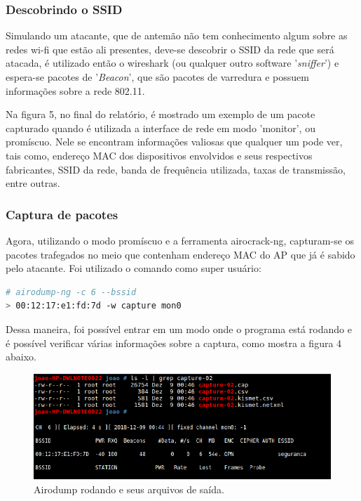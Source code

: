 \documentclass[journal]{IEEEtran}
\begin{document}
\subsubsection{Descobrindo o SSID}
Simulando um atacante, que de antemão não tem conhecimento algum sobre as redes wi-fi que estão ali presentes, deve-se descobrir o SSID da rede que será atacada, é utilizado então o wireshark (ou qualquer outro software '\textit{sniffer}') e espera-se pacotes de '\textit{Beacon}', que são pacotes de varredura e possuem informações sobre a rede 802.11.\par
Na figura 5, no final do relatório, é mostrado um exemplo de um pacote capturado quando é utilizada a interface de rede em modo 'monitor', ou promíscuo. Nele se encontram informações valiosas que qualquer um pode ver, tais como, endereço MAC dos dispositivos envolvidos e seus respectivos fabricantes, SSID da rede, banda de frequência utilizada, taxas de transmissão, entre outras.



\subsubsection{Captura de pacotes}
Agora, utilizando o modo promíscuo e a ferramenta airocrack-ng, capturam-se os pacotes trafegados no meio que contenham endereço MAC do AP que já é sabido pelo atacante. Foi utilizado o comando como super usuário:
\begin{lstlisting}[language=Bash]
# airodump-ng -c 6 --bssid 
> 00:12:17:e1:fd:7d -w capture mon0
\end{lstlisting}

Dessa maneira, foi possível entrar em um modo onde o programa está rodando e é possível verificar várias informações sobre a captura, como mostra a figura 4 abaixo.

\begin{figure}[h!]
	\includegraphics[width=\linewidth]{../pictures/airocrack_running+pcaps.png}
	\caption{Airodump rodando e seus arquivos de saída.}
	\label{fig:airodump}
\end{figure}
\end{document}
